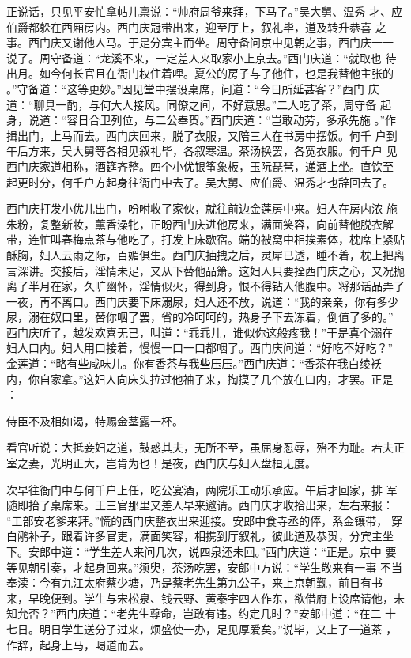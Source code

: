 正说话，只见平安忙拿帖儿禀说：“帅府周爷来拜，下马了。”吴大舅、温秀
才、应伯爵都躲在西厢房内。西门庆冠带出来，迎至厅上，叙礼毕，道及转升恭喜
之事。西门庆又谢他人马。于是分宾主而坐。周守备问京中见朝之事，西门庆一一
说了。周守备道：“龙溪不来，一定差人来取家小上京去。”西门庆道：“就取也
待出月。如今何长官且在衙门权住着哩。夏公的房子与了他住，也是我替他主张的
。”守备道：“这等更妙。”因见堂中摆设桌席，问道：“今日所延甚客？”西门
庆道：“聊具一酌，与何大人接风。同僚之间，不好意思。”二人吃了茶，周守备
起身，说道：“容日合卫列位，与二公奉贺。”西门庆道：“岂敢动劳，多承先施
。”作揖出门，上马而去。西门庆回来，脱了衣服，又陪三人在书房中摆饭。何千
户到午后方来，吴大舅等各相见叙礼毕，各叙寒温。茶汤换罢，各宽衣服。何千户
见西门庆家道相称，酒筵齐整。四个小优银筝象板，玉阮琵琶，递酒上坐。直饮至
起更时分，何千户方起身往衙门中去了。吴大舅、应伯爵、温秀才也辞回去了。

西门庆打发小优儿出门，吩咐收了家伙，就往前边金莲房中来。妇人在房内浓
施朱粉，复整新妆，薰香澡牝，正盼西门庆进他房来，满面笑容，向前替他脱衣解
带，连忙叫春梅点茶与他吃了，打发上床歇宿。端的被窝中相挨素体，枕席上紧贴
酥胸，妇人云雨之际，百媚俱生。西门庆抽拽之后，灵犀已透，睡不着，枕上把离
言深讲。交接后，淫情未足，又从下替他品箫。这妇人只要拴西门庆之心，又况抛
离了半月在家，久旷幽怀，淫情似火，得到身，恨不得钻入他腹中。将那话品弄了
一夜，再不离口。西门庆要下床溺尿，妇人还不放，说道：“我的亲亲，你有多少
尿，溺在奴口里，替你咽了罢，省的冷呵呵的，热身子下去冻着，倒值了多的。”
西门庆听了，越发欢喜无已，叫道：“乖乖儿，谁似你这般疼我！”于是真个溺在
妇人口内。妇人用口接着，慢慢一口一口都咽了。西门庆问道：“好吃不好吃？”
金莲道：“略有些咸味儿。你有香茶与我些压压。”西门庆道：“香茶在我白绫袄
内，你自家拿。”这妇人向床头拉过他袖子来，掏摸了几个放在口内，才罢。正是
：

侍臣不及相如渴，特赐金茎露一杯。

看官听说：大抵妾妇之道，鼓惑其夫，无所不至，虽屈身忍辱，殆不为耻。若夫正
室之妻，光明正大，岂肯为也！是夜，西门庆与妇人盘桓无度。

次早往衙门中与何千户上任，吃公宴酒，两院乐工动乐承应。午后才回家，排
军随即抬了桌席来。王三官那里又差人早来邀请。西门庆才收拾出来，左右来报：
“工部安老爹来拜。”慌的西门庆整衣出来迎接。安郎中食寺丞的俸，系金镶带，
穿白鹇补子，跟着许多官吏，满面笑容，相携到厅叙礼，彼此道及恭贺，分宾主坐
下。安郎中道：“学生差人来问几次，说四泉还未回。”西门庆道：“正是。京中
要等见朝引奏，才起身回来。”须臾，茶汤吃罢，安郎中方说：“学生敬来有一事
不当奉渎：今有九江太府蔡少塘，乃是蔡老先生第九公子，来上京朝觐，前日有书
来，早晚便到。学生与宋松泉、钱云野、黄泰宇四人作东，欲借府上设席请他，未
知允否？”西门庆道：“老先生尊命，岂敢有违。约定几时？”安郎中道：“在二
十七日。明日学生送分子过来，烦盛使一办，足见厚爱矣。”说毕，又上了一道茶
，作辞，起身上马，喝道而去。

